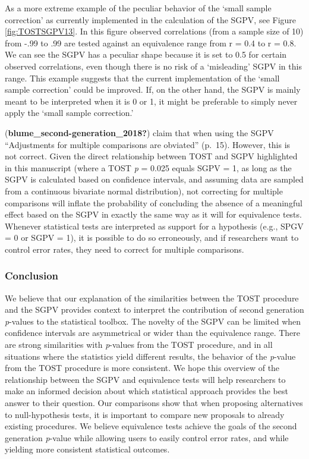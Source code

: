 \documentclass[
  english,
  man]{apa6}
\begin{document}
As a more extreme example of the peculiar behavior of the `small sample correction' as currently implemented in the calculation of the SGPV, see Figure \ref{fig:TOSTSGPV13}. In this figure observed correlations (from a sample size of 10) from -.99 to .99 are tested against an equivalence range from r = 0.4 to r = 0.8. We can see the SGPV has a peculiar shape because it is set to 0.5 for certain observed correlations, even though there is no risk of a `misleading' SGPV in this range. This example suggests that the current implementation of the `small sample correction' could be improved. If, on the other hand, the SGPV is mainly meant to be interpreted when it is 0 or 1, it might be preferable to simply never apply the `small sample correction.'

(\textbf{blume\_second-generation\_2018?}) claim that when using the SGPV ``Adjustments for multiple comparisons are obviated'' (p.~15). However, this is not correct. Given the direct relationship between TOST and SGPV highlighted in this manuscript (where a TOST \emph{p} = 0.025 equals SGPV = 1, as long as the SGPV is calculated based on confidence intervals, and assuming data are sampled from a continuous bivariate normal distribution), not correcting for multiple comparisons will inflate the probability of concluding the absence of a meaningful effect based on the SGPV in exactly the same way as it will for equivalence tests. Whenever statistical tests are interpreted as support for a hypothesis (e.g., SPGV = 0 or SGPV = 1), it is possible to do so erroneously, and if researchers want to control error rates, they need to correct for multiple comparisons.

\hypertarget{conclusion}{%
\subsubsection{Conclusion}\label{conclusion}}

We believe that our explanation of the similarities between the TOST procedure and the SGPV provides context to interpret the contribution of second generation \emph{p}-values to the statistical toolbox. The novelty of the SGPV can be limited when confidence intervals are asymmetrical or wider than the equivalence range. There are strong similarities with \emph{p}-values from the TOST procedure, and in all situations where the statistics yield different results, the behavior of the \emph{p}-value from the TOST procedure is more consistent. We hope this overview of the relationship between the SGPV and equivalence tests will help researchers to make an informed decision about which statistical approach provides the best answer to their question. Our comparisons show that when proposing alternatives to null-hypothesis tests, it is important to compare new proposals to already existing procedures. We believe equivalence tests achieve the goals of the second generation \emph{p}-value while allowing users to easily control error rates, and while yielding more consistent statistical outcomes.
\end{document}
